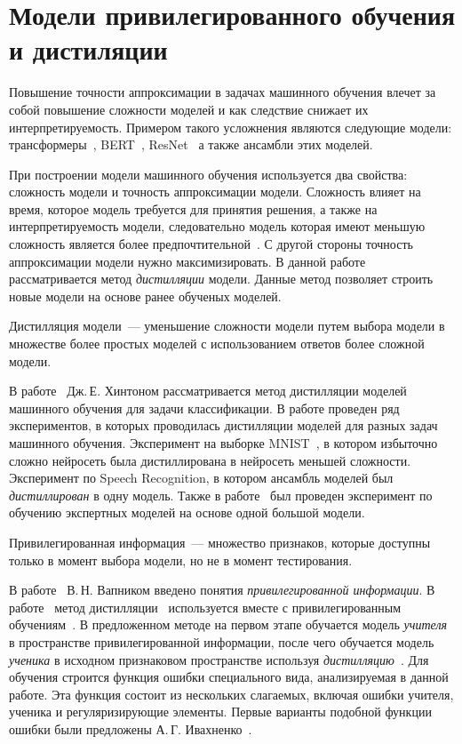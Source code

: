 \newpage


\section{Модели привилегированного обучения и дистиляции}
Повышение точности аппроксимации в задачах машинного обучения влечет за собой повышение сложности моделей и как следствие снижает их интерпретируемость. Примером такого усложнения являются следующие модели: трансформеры~\cite{Vaswani2017}, BERT~\cite{Devlin2018}, ResNet~\cite{Kaiming2015} а также ансамбли этих моделей. 

При построении модели машинного обучения используется два свойства: сложность модели и точность аппроксимации модели. Сложность влияет на время, которое модель требуется для принятия решения, а также на интерпретируемость модели, следовательно модель которая имеют меньшую сложность является более предпочтительной~\cite{bachteev2018}. С другой стороны точность аппроксимации модели нужно максимизировать. В данной работе рассматривается метод \textit{дистилляции} модели. Данные метод позволяет строить новые модели на основе ранее обученых моделей.

\begin{definition}
Дистилляция модели~--- уменьшение сложности модели путем выбора модели в множестве более простых моделей с использованием ответов более сложной модели.
\end{definition}

В работе~\cite{Hinton2015} Дж.\,Е. Хинтоном рассматривается метод дистилляции моделей машинного обучения для задачи классификации. В работе проведен ряд экспериментов, в которых проводилась дистилляции моделей для разных задач машинного обучения. Эксперимент на выборке MNIST~\cite{mnist}, в котором избыточно сложно нейросеть была дистиллирована в нейросеть меньшей сложности. Эксперимент по Speech Recognition, в котором ансамбль моделей был \textit{дистиллирован} в одну модель. Также в работе~\cite{Hinton2015} был проведен эксперимент по обучению экспертных моделей на основе одной большой модели.

\begin{definition}
Привилегированная информация~--- множество признаков, которые доступны только в момент выбора модели, но не в момент тестирования.
\end{definition}

В работе~\cite{Vapnik2015} В.\,Н. Вапником введено понятия \textit{привилегированной информации}. В работе~\cite{Lopez2016} метод дистилляции~\cite{Hinton2015} используется вместе с привилегированным обучениям~\cite{Vapnik2015}. В предложенном методе на первом этапе обучается модель \textit{учителя} в пространстве привилегированной информации, после чего обучается модель \textit{ученика} в исходном признаковом пространстве используя \textit{дистилляцию}~\cite{Hinton2015}. Для обучения строится функция ошибки специального вида, анализируемая в данной работе. Эта функция состоит из нескольких слагаемых, включая ошибки учителя, ученика и регуляризирующие элементы.  Первые варианты подобной функции ошибки были предложены А.\,Г. Ивахненко~\cite{Ivakhnenko1994}.

